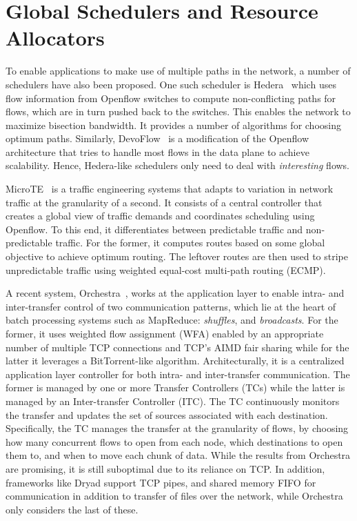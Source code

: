 \documentclass[a4paper,12pt,twoside,openright]{report}
\begin{document}
\section{Global Schedulers and Resource Allocators}
To enable applications to make use of multiple paths in the network, a number of
schedulers have also been proposed. One such scheduler is
Hedera~\cite{Al-Fares:2010:HDF} which uses flow information from Openflow
switches to compute non-conflicting paths for flows, which are in turn pushed
back to the switches. This enables the network to maximize bisection bandwidth.
It provides a number of algorithms for choosing optimum paths. Similarly,
DevoFlow~\cite{Curtis:2011:DSF} is a modification of the Openflow architecture
that tries to handle most flows in the data plane to achieve scalability. Hence,
Hedera-like schedulers only need to deal with \emph{interesting} flows.

MicroTE~\cite{Benson:2011:MFG} is a traffic engineering systems that adapts to
variation in network traffic at the granularity of a second. It consists of a
central controller that creates a global view of traffic demands and coordinates
scheduling using Openflow. To this end, it differentiates between predictable
traffic and non-predictable traffic. For the former, it computes routes based on
some global objective to achieve optimum routing. The leftover routes are then
used to stripe unpredictable traffic using weighted equal-cost multi-path
routing (ECMP).

A recent system, Orchestra~\cite{Chowdhury:2011:MDT}, works at the application
layer to enable intra- and inter-transfer control of two communication patterns,
which lie at the heart of batch processing systems such as MapReduce:
\emph{shuffles}, and \emph{broadcasts}. For the former, it uses weighted flow
assignment (WFA) enabled by an appropriate number of multiple TCP connections
and TCP's AIMD fair sharing while for the latter it leverages a BitTorrent-like
algorithm. Architecturally, it is a centralized application layer controller for
both intra- and inter-transfer communication. The former is managed by one or
more Transfer Controllers (TCs) while the latter is managed by an Inter-transfer
Controller (ITC). The TC continuously monitors the transfer and updates the set
of sources associated with each destination. Specifically, the TC manages the
transfer at the granularity of flows, by choosing how many concurrent flows to
open from each node, which destinations to open them to, and when to move each
chunk of data. While the results from Orchestra are promising, it is still
suboptimal due to its reliance on TCP. In addition, frameworks like Dryad
support TCP pipes, and shared memory FIFO for communication in addition to
transfer of files over the network, while Orchestra only considers the last of
these.
\end{document}

